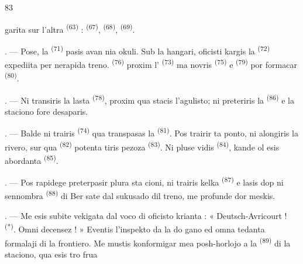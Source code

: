 \begin{VUpage}[85]{83}

\VUcontinue
garita sur l'altra  \textsuperscript{(63)} :  \textsuperscript{(67)},\nl
{} \textsuperscript{(68)},  \textsuperscript{(69)}.

. --- Pose, la  \textsuperscript{(71)} pasis\nl
avan nia okuli. Sub la hangari, oficisti kargis\nl
la  \textsuperscript{(72)} expediita per nerapida treno. \cc
{} \textsuperscript{(76)} proxim l' \textsuperscript{(73)} ma\cc
novris  \textsuperscript{(75)} e  \textsuperscript{(79)}\nl
por formacar  \textsuperscript{(80)}.

. --- Ni transiris la lasta  \textsuperscript{(78)},\nl
proxim qua stacis l'agulisto; ni preteriris la\nl
{} \textsuperscript{(86)} e la staciono fore desaparis.

. --- Balde ni trairis  \textsuperscript{(74)} qua\nl
transpasas la  \textsuperscript{(81)}. Pos trairir ta ponto,\nl
ni alongiris la rivero, sur qua  \textsuperscript{(82)}\nl
potenta tiris pezoza  \textsuperscript{(83)}. Ni pluse\nl
vidis  \textsuperscript{(84)}, kande ol esis abordanta\nl
{} \textsuperscript{(85)}.

. --- Pos rapidege preterpasir plura sta\cc
cioni, ni trairis kelka  \textsuperscript{(87)} e lasis dop ni\nl
{} sennombra \textsuperscript{(88)} di  Ber\cc
sate dal sukusado dil treno, me profunde dor\cc
meskis.

\VUsaut{3.0mm}
\VUsaut{3.0mm}

. --- Me esis subite vekigata dal voco di\nl
oficisto krianta : « Deutsch-Avricourt ! \textsuperscript{(*)}.\nl
Omni decensez ! » Eventis l'inspekto da la do\cc
gano ed omna tedanta formalaji di la frontiero.\nl
Me mustis konformigar mea posh-horlojo a la\nl
{} \textsuperscript{(89)} di la staciono, qua esis tro frua
\parplein
\end{VUpage}

